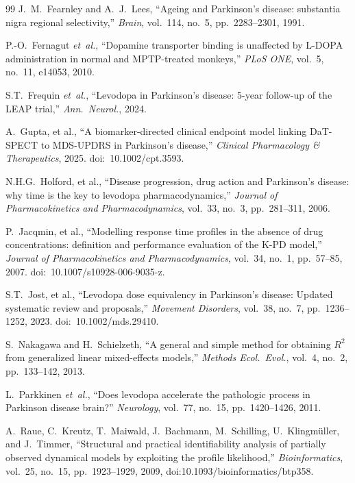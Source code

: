 \begin{thebibliography}{99}
J.~M.~Fearnley and A.~J.~Lees, ``Ageing and Parkinson's disease: substantia nigra regional selectivity,'' \textit{Brain}, vol.~114, no.~5, pp.~2283--2301, 1991.

P.-O.~Fernagut \textit{et~al.}, ``Dopamine transporter binding is
unaffected by L-DOPA administration in normal and MPTP-treated monkeys,''
\textit{PLoS ONE}, vol.~5, no.~11, e14053, 2010.

S.T.~Frequin \textit{et~al.}, ``Levodopa in Parkinson's disease: 5-year
follow-up of the LEAP trial,'' \textit{Ann.\ Neurol.}, 2024.

A.~Gupta, et al., ``A biomarker-directed clinical endpoint model linking DaT-SPECT to MDS-UPDRS in Parkinson's disease,'' \textit{Clinical Pharmacology \& Therapeutics}, 2025. doi:~10.1002/cpt.3593.

N.H.G.~Holford, et al., ``Disease progression, drug action and Parkinson's disease: why time is the key to levodopa pharmacodynamics,'' \textit{Journal of Pharmacokinetics and Pharmacodynamics}, vol.~33, no.~3, pp.~281--311, 2006.

P.~Jacqmin, et al., ``Modelling response time profiles in the absence of drug concentrations: definition and performance evaluation of the K-PD model,'' \textit{Journal of Pharmacokinetics and Pharmacodynamics}, vol.~34, no.~1, pp.~57--85, 2007. doi:~10.1007/s10928-006-9035-z.

S.T.~Jost, et al., ``Levodopa dose equivalency in Parkinson's disease: Updated systematic review and proposals,'' \textit{Movement Disorders}, vol.~38, no.~7, pp.~1236--1252, 2023. doi:~10.1002/mds.29410.

S.~Nakagawa and H.~Schielzeth, ``A general and simple method for
obtaining $R^2$ from generalized linear mixed-effects models,''
\textit{Methods Ecol.\ Evol.}, vol.~4, no.~2, pp.~133--142, 2013.

L.~Parkkinen \textit{et~al.}, ``Does levodopa accelerate the pathologic
process in Parkinson disease brain?'' \textit{Neurology}, vol.~77,
no.~15, pp.~1420--1426, 2011.

A.~Raue, C.~Kreutz, T.~Maiwald, J.~Bachmann, M.~Schilling, U.~Klingm{\"u}ller, and J.~Timmer, ``Structural and practical identifiability analysis of partially observed dynamical models by exploiting the profile likelihood,'' \textit{Bioinformatics}, vol.~25, no.~15, pp.~1923--1929, 2009, doi:10.1093/bioinformatics/btp358.


\end{thebibliography}
